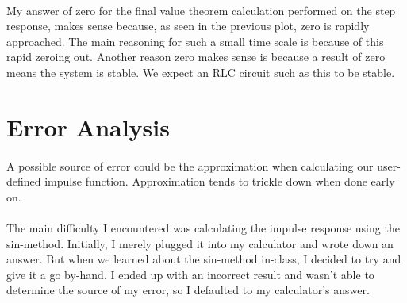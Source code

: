 \documentclass[12pt]{report}
\begin{document}
    \paragraph{} My answer of zero for the final value theorem calculation performed on the step response, makes sense because, as seen in the previous plot, zero is rapidly approached. The main reasoning for such a small time scale is because of this rapid zeroing out. Another reason zero makes sense is because a result of zero means the system is stable. We expect an RLC circuit such as this to be stable. 

\section{Error Analysis}


\paragraph{} A possible source of error could be the approximation when calculating our user-defined impulse function. Approximation tends to trickle down when done early on. 

\paragraph{} The main difficulty I encountered was calculating the impulse response using the sin-method. Initially, I merely plugged it into my calculator and wrote down an answer. But when we learned about the sin-method in-class, I decided to try and give it a go by-hand. I ended up with an incorrect result and wasn't able to determine the source of my error, so I defaulted to my calculator's answer.  
\end{document}
